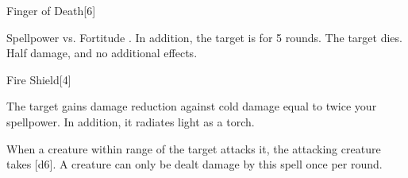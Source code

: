 \begin{spellsection}{Finger of Death}[6]
    \begin{spellheader}
    \end{spellheader}
    \begin{spellcontent}
        \begin{spelltargetinginfo}
        \end{spelltargetinginfo}
        \begin{spelleffects}
            \begin{spellattack}{Spellpower vs. Fortitude}
                \spellsuccess {}. In addition, the target is \staggered for 5 rounds.
                \spellcritical The target dies.
                \spellfailure Half damage, and no additional effects.
            \end{spellattack}
        \end{spelleffects}
    \end{spellcontent}
    \begin{spellfooter}
        \miscastrandom
    \end{spellfooter}
    \begin{spellaugments}
    \end{spellaugments}
\end{spellsection}

\begin{spellsection}{Fire Shield}[4]
    \begin{spellheader}
    \end{spellheader}
    \begin{spellcontent}
        \begin{spelltargetinginfo}
        \end{spelltargetinginfo}
        \begin{spelleffects}
            \spelleffect The target gains damage reduction against cold damage equal to twice your spellpower. In addition, it radiates light as a torch.

            When a creature within \rngclose range of the target attacks it, the attacking creature takes [d6].
            A creature can only be dealt damage by this spell once per round.
            \spelldur \durshort \dismissable
        \end{spelleffects}
    \end{spellcontent}
    \begin{spellfooter}
        \miscastexplode
    \end{spellfooter}
\end{spellsection}

